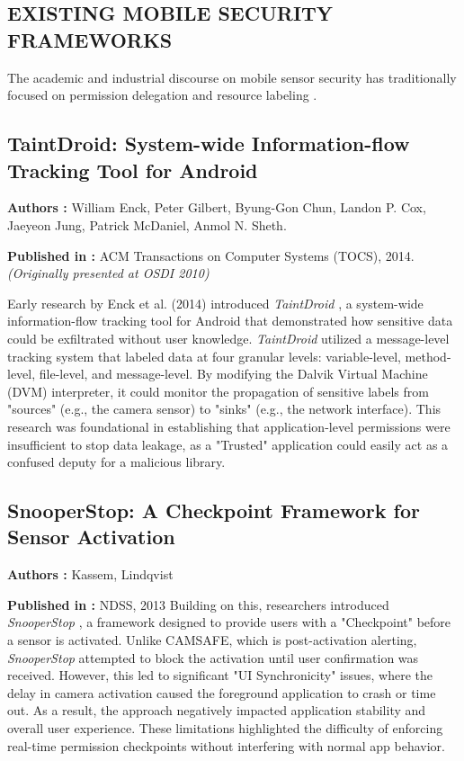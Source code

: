 \documentclass[12pt,a4paper]{report}
\begin{document}
\begin{enumerate}
    \section{EXISTING MOBILE SECURITY FRAMEWORKS}

    The academic and industrial discourse on mobile sensor security has traditionally focused on permission delegation and resource labeling \cite{malwaresurvey}.

    \subsection{TaintDroid: System-wide Information-flow Tracking Tool for Android}

    \textbf{Authors :} William Enck, Peter Gilbert, Byung-Gon Chun, Landon P. Cox, Jaeyeon Jung, Patrick McDaniel, Anmol N. Sheth.

    \textbf{Published in :} ACM Transactions on Computer Systems (TOCS), 2014. \textit{(Originally presented at OSDI 2010)}

    Early research by Enck et al. (2014) introduced \textit{TaintDroid} \cite{taintdroid}, a system-wide information-flow tracking tool for Android that demonstrated how sensitive data could be exfiltrated without user knowledge. \textit{TaintDroid} utilized a message-level tracking system that labeled data at four granular levels: variable-level, method-level, file-level, and message-level. By modifying the Dalvik Virtual Machine (DVM) interpreter, it could monitor the propagation of sensitive labels from "sources" (e.g., the camera sensor) to "sinks" (e.g., the network interface). This research was foundational in establishing that application-level permissions were insufficient to stop data leakage, as a "Trusted" application could easily act as a confused deputy for a malicious library.

    \subsection{SnooperStop: A Checkpoint Framework for Sensor Activation}

    \textbf{Authors :} Kassem, Lindqvist

    \textbf{Published in :} NDSS, 2013
 Building on this, researchers introduced \textit{SnooperStop} \cite{snooperstop}, a framework designed to provide users with a "Checkpoint" before a sensor is activated. Unlike CAMSAFE, which is post-activation alerting, \textit{SnooperStop} attempted to block the activation until user confirmation was received. However, this led to significant "UI Synchronicity" issues, where the delay in camera activation caused the foreground application to crash or time out. As a result, the approach negatively impacted application stability and overall user experience. These limitations highlighted the difficulty of enforcing real-time permission checkpoints without interfering with normal app behavior.



\end{enumerate}
\end{document}
